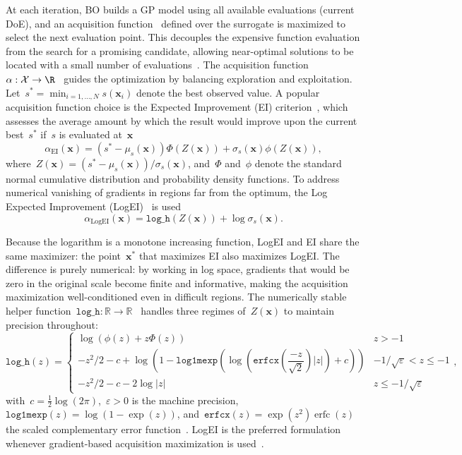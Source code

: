 At each iteration, BO builds a GP model using all available evaluations (current DoE), and an acquisition function~\cite{jones1998,shahriari2016} defined over the surrogate is maximized to select the next evaluation point. This decouples the expensive function evaluation from the search for a promising candidate, allowing near-optimal solutions to be located with a small number of evaluations~\cite{jones1998,priem2020}. The acquisition function~\(\alpha: \mathcal{X} \to \R\)~\cite{jones1998,frazier2018,shahriari2016} guides the optimization by balancing exploration and exploitation. Let~\(s^* = \min_{i = 1,\ldots,N} s(\bm{x}_i)\) denote the best observed value. A popular acquisition function choice is the Expected Improvement (EI) criterion~\cite{jones1998}, which  assesses the average amount by which the result would improve upon the current best~\(s^*\) if~\(s\) is evaluated at~\(\bm{x}\)
\begin{equation}\label{eqn:ei}
  \alpha_\text{EI}(\bm{x}) = (s^* - \mu_s(\bm{x})) \Phi(Z(\bm{x})) + \sigma_s(\bm{x}) \phi(Z(\bm{x})),
\end{equation}
where~\(Z(\bm{x}) = (s^* - \mu_s(\bm{x}))/\sigma_s(\bm{x})\), and~\(\Phi\) and~\(\phi\) denote the standard normal cumulative distribution and probability density functions.
To address numerical vanishing of gradients in regions far from the optimum, the Log Expected Improvement (LogEI)~\cite{ament2023} is used
\begin{equation}\label{eqn:logei}
  \alpha_\text{LogEI}(\bm{x}) = \texttt{log\_h}(Z(\bm{x})) + \log\sigma_s(\bm{x}).
\end{equation}

Because the logarithm is a monotone increasing function, LogEI and EI share the same maximizer: the point~\(\bm{x}^*\) that maximizes EI also maximizes LogEI. The difference is purely numerical: by working in log space, gradients that would be zero in the original scale become finite and informative, making the acquisition maximization well-conditioned even in difficult regions. The numerically stable helper function~\(\texttt{log\_h}: \mathbb{R} \to \mathbb{R}\)~\cite{ament2023} handles three regimes of~\(Z(\bm{x})\) to maintain precision throughout:
\begin{equation}\label{eqn:log_h}
  \texttt{log\_h}(z) =
  \begin{cases}
    \log\left(\phi(z) + z\Phi(z)\right) & z > -1 \\
    -z^2/2 - c + \log\left(1 - \texttt{log1mexp}\left(\log\left(\texttt{erfcx}\left(\dfrac{-z}{\sqrt{2}}\right)|z|\right) + c\right)\right) & -1/\sqrt{\varepsilon} < z \le -1 \\
    -z^2/2 - c - 2\log|z| & z \le -1/\sqrt{\varepsilon}
  \end{cases},
\end{equation}
with~\(c = \tfrac{1}{2}\log(2\pi)\),~\(\varepsilon > 0\) is the machine precision,~\(\texttt{log1mexp}(z) = \log(1 - \exp(z))\), and~\(\texttt{erfcx}(z) = \exp(z^2)\operatorname{erfc}(z)\) the scaled complementary error function~\cite{ament2023}. LogEI is the preferred formulation whenever gradient-based acquisition maximization is used~\cite{ament2023,cordelier2025}.

